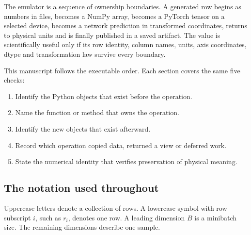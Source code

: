 \documentclass[10pt,aps,prd,twocolumn,nofootinbib]{revtex4-2}
\begin{document}
The emulator is a sequence of ownership boundaries.  A generated row begins
as numbers in files, becomes a NumPy
array, becomes a PyTorch tensor on a selected device, becomes a network
prediction in transformed coordinates, returns to physical units and is
finally published in a saved artifact.  The value is scientifically useful
only if its row identity, column names, units, axis coordinates, dtype and
transformation law survive every boundary.

This manuscript follows the executable order.  Each section covers the same
five checks:
\begin{enumerate}
  \item Identify the Python objects that exist before the operation.
  \item Name the function or method that owns the operation.
  \item Identify the new objects that exist afterward.
  \item Record which operation copied data, returned a view or deferred work.
  \item State the numerical identity that verifies preservation of physical
        meaning.
\end{enumerate}

\subsection{The notation used throughout}

Uppercase letters denote a collection of rows.  A lowercase symbol with row
subscript $i$, such as $r_i$, denotes one row.  A leading dimension $B$ is a
minibatch size.  The remaining dimensions describe one sample.
\end{document}

